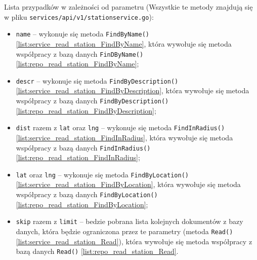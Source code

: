 Lista przypadków w zależności od parametru (Wszystkie te metody znajdują się w pliku \texttt{services/api/v1/stationservice.go}):
\begin{itemize}
    \item \texttt{name} -- wykonuje się metoda \texttt{FindByName()} \ref{list:service_read_station_FindByName}, która wywołuje się metoda współpracy z bazą danych \texttt{FinDByName()} \ref{list:repo_read_station_FindByName};
    \item \texttt{descr} -- wykonuje się metoda \texttt{FindByDescription()} \ref{list:service_read_station_FindByDescription}, która wywołuje się metoda współpracy z bazą danych \texttt{FindByDescription()} \ref{list:repo_read_station_FindByDescription};
    \item \texttt{dist} razem z \texttt{lat} oraz \texttt{lng} -- wykonuje się metoda \texttt{FindInRadius()} \ref{list:service_read_station_FindInRadius}, która wywołuje się metoda współpracy z bazą danych \texttt{FindInRadius()} \ref{list:repo_read_station_FindInRadius};
    \item \texttt{lat} oraz \texttt{lng} -- wykonuje się metoda \texttt{FindByLocation()} \ref{list:service_read_station_FindByLocation}, która wywołuje się metoda współpracy z bazą danych \texttt{FindByLocation()} \ref{list:repo_read_station_FindByLocation};
    \item \texttt{skip} razem z \texttt{limit} -- bedzie pobrana lista kolejnych dokumentów z bazy danych, która będzie ograniczona przez te parametry (metoda \texttt{Read()} \ref{list:service_read_station_Read}), która wywołuje się metoda współpracy z bazą danych \texttt{Read()} \ref{list:repo_read_station_Read}.
\end{itemize}

